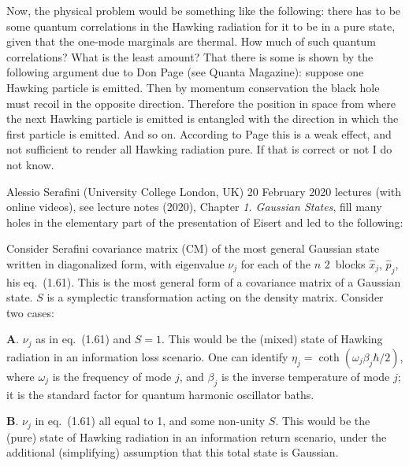 \begin{description}
Now, the physical problem would be something like the following: there has to
be some quantum correlations in the Hawking radiation for it to be in a pure
state, given that the one-mode marginals are thermal. How much of such
quantum correlations? What is the least amount? That there is some is shown
by the following argument due to Don Page
(see 
{Quanta Magazine}): suppose one Hawking particle is
emitted. Then by momentum conservation the black hole must recoil in the
opposite direction. Therefore the position in space from where the next
Hawking particle is emitted is entangled with the direction in which the
first particle is emitted. And so on. According to Page this is a weak
effect, and not sufficient to render all Hawking radiation pure. If that is
correct or not I do not know.

\item[2023-01-07 Erik]
{Alessio Serafini} (University College London, UK)
{20 February 2020 lectures}
(with  online videos),
see
{lecture notes} (2020), Chapter {\em 1. Gaussian States},
fill many holes in the elementary part of the presentation of
Eisert\etal{} and led to the following:

Consider Serafini
covariance matrix (CM) of the most general Gaussian state written in
diagonalized form, with eigenvalue $\nu_j$ for each of the $n$ 2\dmn\
blocks $\hat{x}_j$, $\hat{p}_j$, his
eq.~(1.61). This is the most general form of a covariance
matrix of a Gaussian state. $S$ is a symplectic transformation acting on the
density matrix. Consider two cases:

\medskip
\textbf{A}. $\nu_j$ as in eq.~(1.61) and $S=1$.
This would be the (mixed) state of Hawking radiation in an information loss scenario.
One can identify $\eta_j = \coth(\omega_j \beta_j \hbar /2)$,
where $\omega_j$ is the frequency of mode $j$, and $\beta_j$ is the inverse temperature of mode $j$;
it is the standard factor for quantum harmonic oscillator baths.

\medskip
\textbf{B}. $\nu_j$ in eq.~(1.61) all equal to 1, and some non-unity $S$.
This would be the (pure) state of Hawking radiation in an information return scenario,
under the additional (simplifying) assumption that this total state is Gaussian.


\end{description}
